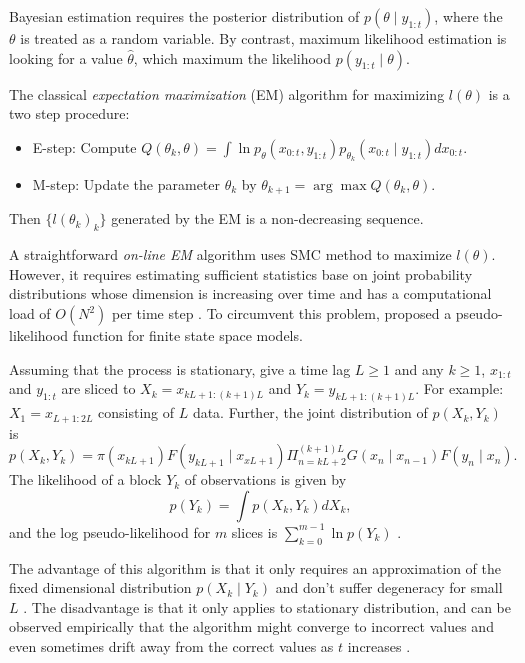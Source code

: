 Bayesian estimation requires the posterior distribution of $p(\theta\mid y_{1:t})$, where the $\theta$ is treated as a random variable. By contrast, maximum likelihood estimation is looking for a value $\hat{\theta}$, which maximum the likelihood $p(y_{1:t}\mid \theta)$. 

The classical \textit{expectation maximization} (EM) algorithm \cite{dempster1977maximum} for maximizing $l(\theta)$ is a two step procedure: 
\begin{itemize}
\item{E-step}:   Compute  $Q(\theta_k,\theta)=\int \ln p_\theta(x_{0:t},y_{1:t})p_{\theta_k}(x_{0:t}\mid y_{1:t}) dx_{0:t}$. 
\item{M-step}: Update the parameter $\theta_k$ by $\theta_{k+1}=\arg \max Q(\theta_k,\theta)$.
\end{itemize}
Then $\{l(\theta_k)_k\}$ generated by the EM is a non-decreasing sequence.  

A straightforward \textit{on-line EM} algorithm uses SMC method to maximize $l(\theta)$. However, it requires estimating sufficient statistics base on joint probability distributions whose dimension is increasing over time and has a computational load of $\mathit{O}(N^2)$ per time step \cite{kantas2009overview}.  To circumvent this problem, \cite{andrieu2005line} proposed a pseudo-likelihood function for finite state space models. 

Assuming that the process is stationary, give a time lag $L\geq 1$ and any $k\geq 1$, $x_{1:t}$ and $y_{1:t}$ are sliced to $X_k= x_{kL+1:(k+1)L}$ and $Y_k=  y_{kL+1:(k+1)L}$. For example: $X_1= x_{L+1:2L}$ consisting of $L$ data. Further, the joint distribution of $p(X_k,Y_k)$ is 
\begin{equation}
p(X_k,Y_k) = \pi(x_{kL+1})F(y_{kL+1}\mid x_{xL+1})\Pi_{n=kL+2}^{(k+1)L}G(x_n\mid x_{n-1})F(y_n\mid x_n). 
\end{equation}
The likelihood of a block $Y_k$ of observations is given by 
\begin{equation}
p(Y_k) = \int p(X_k,Y_k)dX_k,
\end{equation}
and the log pseudo-likelihood for $m$ slices is $\sum_{k=0}^{m-1}\ln p(Y_k)$  \cite{andrieu2005line}.


The advantage of this algorithm is that it only requires an approximation of the fixed dimensional distribution $p(X_k\mid Y_k)$ and don't suffer degeneracy for small $L$ \cite{kantas2009overview}. The disadvantage is that it only applies to stationary distribution, and can be observed empirically that the algorithm might converge to incorrect values and even sometimes drift away from the correct values as $t$ increases \cite{andrieu2010particle}.  




